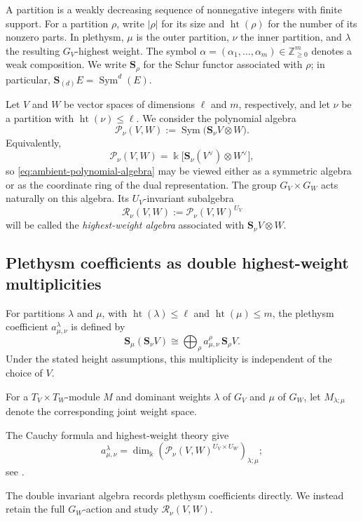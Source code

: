 \documentclass[11pt]{amsart}
\theoremstyle{definition}
\theoremstyle{remark}
\newcommand{\kk}{\Bbbk}
\newcommand{\Sym}{\operatorname{Sym}}
\newcommand{\htp}{\operatorname{ht}}
\newcommand{\cP}{\mathcal P}
\newcommand{\cR}{\mathcal R}
\begin{document}
A partition is a weakly decreasing sequence of nonnegative integers with
finite support.  For a partition $\rho$, write $|\rho|$ for its size and
$\htp(\rho)$ for the number of its nonzero parts.  In plethysm, $\mu$ is the
outer partition, $\nu$ the inner partition, and $\lambda$ the resulting
$G_V$-highest weight.  The symbol
$\alpha=(\alpha_1,\ldots,\alpha_m)\in\mathbb Z_{\geq0}^m$ denotes a weak
composition.  We write $\mathbf S_\rho$ for the Schur functor associated
with $\rho$; in particular, $\mathbf S_{(d)}E=\Sym^d(E)$.

Let $V$ and $W$ be vector spaces of dimensions $\ell$ and $m$, respectively,
and let $\nu$ be a partition with $\htp(\nu)\leq \ell$.  We consider the
polynomial algebra
\begin{equation}
 \cP_\nu(V,W)
 :=\Sym\bigl(\mathbf S_\nu V\otimes W\bigr).
 \label{eq:ambient-polynomial-algebra}
\end{equation}
Equivalently,
\[ \cP_\nu(V,W) =\kk\bigl[\mathbf S_\nu(V^\vee)\otimes W^\vee\bigr], \]
so \eqref{eq:ambient-polynomial-algebra} may be viewed either as a symmetric
algebra or as the coordinate ring of the dual representation.  The group
$G_V\times G_W$ acts naturally on this algebra.  Its $U_V$-invariant
subalgebra
\[ \cR_\nu(V,W):=\cP_\nu(V,W)^{U_V} \]
will be called the \emph{highest-weight algebra} associated with
$\mathbf S_\nu V\otimes W$.

\subsection{Plethysm coefficients as double highest-weight multiplicities}

For partitions $\lambda$ and $\mu$, with
$\htp(\lambda)\leq\ell$ and $\htp(\mu)\leq m$, the plethysm coefficient
$a_{\mu,\nu}^{\lambda}$ is defined by
\[ \mathbf S_\mu(\mathbf S_\nu V) \cong \bigoplus_{\rho} a_{\mu,\nu}^{\rho}\,\mathbf S_\rho V. \]
Under the stated height assumptions, this multiplicity is independent of the
choice of $V$.

For a $T_V\times T_W$-module $M$ and dominant weights $\lambda$ of $G_V$ and
$\mu$ of $G_W$, let $M_{\lambda;\mu}$ denote the corresponding joint
weight space.

The Cauchy formula and highest-weight theory give
\[ a_{\mu,\nu}^{\lambda}=\dim_\kk\left(\cP_\nu(V,W)^{U_V\times U_W}\right)_{\lambda;\mu}; \]
see \cite[Chapter~I]{Macdonald}.

The double invariant algebra records plethysm coefficients directly.  We
instead retain the full $G_W$-action and study $\cR_\nu(V,W)$.
\end{document}
